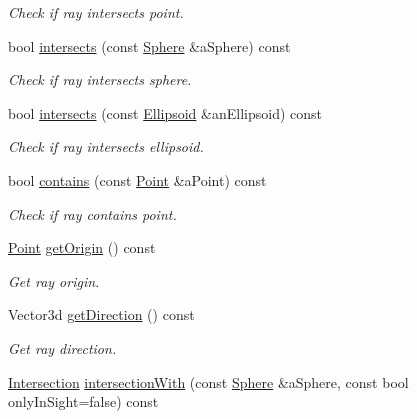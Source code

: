 \begin{DoxyCompactItemize}
\begin{DoxyCompactList}\small\item\em Check if ray intersects point. \end{DoxyCompactList}\item 
bool \hyperlink{classlibrary_1_1math_1_1geom_1_1d3_1_1objects_1_1_ray_ab75f38e9f6f0e7160acdf5360089937b}{intersects} (const \hyperlink{classlibrary_1_1math_1_1geom_1_1d3_1_1objects_1_1_sphere}{Sphere} \&a\+Sphere) const
\begin{DoxyCompactList}\small\item\em Check if ray intersects sphere. \end{DoxyCompactList}\item 
bool \hyperlink{classlibrary_1_1math_1_1geom_1_1d3_1_1objects_1_1_ray_a691d9fda5c22f8cef0b412b9173fe71b}{intersects} (const \hyperlink{classlibrary_1_1math_1_1geom_1_1d3_1_1objects_1_1_ellipsoid}{Ellipsoid} \&an\+Ellipsoid) const
\begin{DoxyCompactList}\small\item\em Check if ray intersects ellipsoid. \end{DoxyCompactList}\item 
bool \hyperlink{classlibrary_1_1math_1_1geom_1_1d3_1_1objects_1_1_ray_a6179dc1453ac7a54b13fe6bf46c0a66b}{contains} (const \hyperlink{classlibrary_1_1math_1_1geom_1_1d3_1_1objects_1_1_point}{Point} \&a\+Point) const
\begin{DoxyCompactList}\small\item\em Check if ray contains point. \end{DoxyCompactList}\item 
\hyperlink{classlibrary_1_1math_1_1geom_1_1d3_1_1objects_1_1_point}{Point} \hyperlink{classlibrary_1_1math_1_1geom_1_1d3_1_1objects_1_1_ray_abaac9b7fcc10e2076ada11f2798386bd}{get\+Origin} () const
\begin{DoxyCompactList}\small\item\em Get ray origin. \end{DoxyCompactList}\item 
Vector3d \hyperlink{classlibrary_1_1math_1_1geom_1_1d3_1_1objects_1_1_ray_ab2e0a6cfd7c2c288ec615a479024fb7d}{get\+Direction} () const
\begin{DoxyCompactList}\small\item\em Get ray direction. \end{DoxyCompactList}\item 
\hyperlink{classlibrary_1_1math_1_1geom_1_1d3_1_1_intersection}{Intersection} \hyperlink{classlibrary_1_1math_1_1geom_1_1d3_1_1objects_1_1_ray_a54e7c2fa56bd086efbf85aa18674b403}{intersection\+With} (const \hyperlink{classlibrary_1_1math_1_1geom_1_1d3_1_1objects_1_1_sphere}{Sphere} \&a\+Sphere, const bool only\+In\+Sight=false) const

\end{DoxyCompactItemize}
